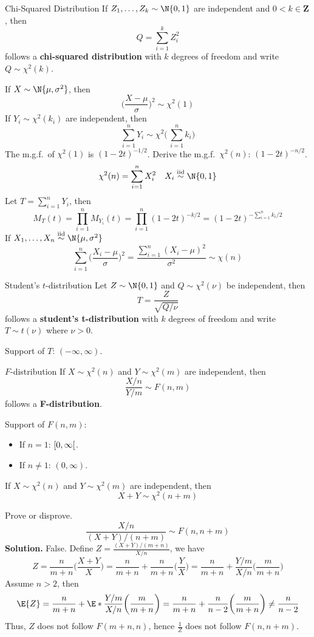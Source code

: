 \begin{Definition}{Chi-Squared Distribution}{}
    If $ Z_1,\ldots,Z_k \sim \N{0,1} $ are independent
    and $ 0<k\in\mathbf{Z} $, then
    \[ Q=\sum_{i=1}^{k} Z_i^2 \]
    follows a \textbf{chi-squared distribution}
    with $ k $ degrees of freedom and write
    $ Q \sim \chi^2(k) $.
\end{Definition}
If $ X \sim \N{\mu,\sigma^2} $, then
\[ \biggl(\frac{X-\mu}{\sigma}\biggr)^{\!2} \sim \chi^2(1)  \]
If $ Y_i \sim \chi^2(k_i) $ are independent, then
\[ \sum_{i=1}^{n} Y_i \sim \chi^2\biggl(\,\sum_{i=1}^{n} k_i\biggr) \]
The m.g.f.\ of $ \chi^2(1) $ is $ (1-2t)^{-1/2} $. Derive
the m.g.f.\ $ \chi^2(n) $: $ (1-2t)^{-n/2} $.
\[ \chi^2(n)=\sum_{i=1}^{n} X_i^2\quad X_i\stackrel{\text{iid}}{\sim}\N{0,1}\]
Let $ T=\sum_{i=1}^{n} Y_i $, then
\[
    M_T(t)
    =\prod_{i=1}^n M_{Y_i}(t)
    =\prod_{i=1}^n(1-2t)^{-k/2}
    =(1-2t)^{-\sum_{i=1}^{n} k_i/2}
\]
If $ X_1,\ldots,X_n\stackrel{\text{iid}}{\sim}\N{\mu,\sigma^2} $
\[ \sum_{i=1}^{n} \biggl(\frac{X_i-\mu}{\sigma}\biggr)^{\!2}=
    \frac{\sum_{i=1}^{n} (X_i-\mu)^2}{\sigma^2}\sim \chi(n)  \]
\begin{Definition}{Student's $ t $-distribution}{}
    Let $ Z \sim \N{0,1} $ and $ Q \sim \chi^2(\nu) $
    be independent, then
    \[ T=\frac{Z}{\sqrt{Q/\nu}}  \]
    follows a \textbf{student's t-distribution}
    with $ k $ degrees of freedom and write
    $ T \sim t(\nu) $ where $ \nu>0 $.

    Support of $ T $: $ (-\infty,\infty) $.
\end{Definition}
\begin{Definition}{$ F $-distribution}{}
    If $ X \sim \chi^2(n) $ and $ Y \sim \chi^2(m) $
    are independent, then
    \[ \frac{X/n}{Y/m} \sim F(n,m) \]
    follows a \textbf{F-distribution}.

    Support of $ F(n,m) $:
    \begin{itemize}
        \item If $ n=1 $: $ \interval[open right]{0}{\infty} $.
        \item If $ n\neq 1 $: $ (0,\infty) $.
    \end{itemize}
\end{Definition}
If $ X \sim \chi^2(n) $ and $ Y \sim \chi^2(m) $ are independent,
then
\[ X+Y \sim \chi^2(n+m) \]
\begin{Exercise}{}{}
    Prove or disprove.
    \[ \frac{X/n}{(X+Y)/(n+m)} \sim F(n,n+m) \]
    \textbf{Solution.} False. Define
    $ \displaystyle Z=\frac{(X+Y)/(m+n)}{X/n} $, we have
    \[ Z=\frac{n}{m+n} \biggl(\frac{X+Y}{X} \biggr)=
        \frac{n}{m+n} +\frac{n}{m+n}\biggl(\frac{Y}{X} \biggr)
        =\frac{n}{m+n} +\frac{Y/m}{X/n} \biggl(\frac{m}{m+n} \biggr) \]
    Assume $ n>2 $, then
    \[ \E{Z}=\frac{n}{m+n} +\E*{\frac{Y/m}{X/n}}\biggl(\frac{m}{m+n} \biggr)
        =\frac{n}{m+n}+\frac{n}{n-2} \bigg(\frac{m}{m+n} \biggr)\ne \frac{n}{n-2}  \]
    Thus, $ Z $ does not follow $ F(m+n,n) $, hence
    $ \displaystyle \frac{1}{Z} $ does not follow $ F(n,n+m) $.
\end{Exercise}
